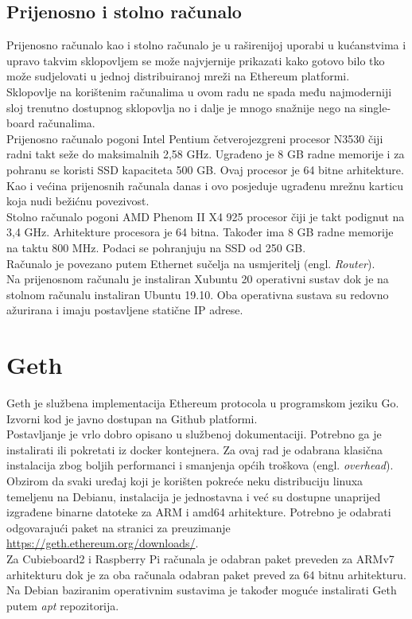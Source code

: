 \documentclass[times, utf8, zavrsni]{fer}
\begin{document}
\subsection{Prijenosno i stolno računalo}
Prijenosno računalo kao i stolno računalo je u raširenijoj uporabi u kućanstvima i upravo takvim sklopovljem se može
najvjernije prikazati kako gotovo bilo tko može sudjelovati u jednoj distribuiranoj mreži na Ethereum platformi. \\
Sklopovlje na korištenim računalima u ovom radu ne spada među najmoderniji sloj trenutno dostupnog sklopovlja no i dalje
je mnogo snažnije nego na single-board računalima. \\
Prijenosno računalo pogoni Intel Pentium četverojezgreni procesor N3530 čiji radni takt seže do maksimalnih 2,58 GHz.
Ugrađeno je 8 GB radne memorije i za pohranu se koristi SSD kapaciteta 500 GB. Ovaj procesor je 64 bitne arhitekture.
Kao i većina prijenosnih računala danas i ovo posjeduje ugrađenu mrežnu karticu koja nudi bežićnu povezivost. \\
Stolno računalo pogoni AMD Phenom II X4 925 procesor čiji je takt podignut na 3,4 GHz. Arhitekture procesora je 64 bitna.
Također ima 8 GB radne memorije na taktu 800 MHz. Podaci se pohranjuju na SSD od 250 GB. \\
Računalo je povezano putem Ethernet sučelja na usmjeritelj (engl. \emph{Router}). \\
Na prijenosnom računalu je instaliran Xubuntu 20 operativni sustav dok je na stolnom računalu instaliran Ubuntu 19.10.
Oba operativna sustava su redovno ažurirana i imaju postavljene statične IP adrese.
\section{Geth}
Geth je službena implementacija Ethereum protocola u programskom jeziku Go. Izvorni kod je javno dostupan na Github platformi. \\
Postavljanje je vrlo dobro opisano u službenoj dokumentaciji. Potrebno ga je instalirati ili pokretati iz docker kontejnera. 
Za ovaj rad je odabrana klasična instalacija zbog boljih performanci i smanjenja općih troškova (engl. \emph{overhead}).
Obzirom da svaki uređaj koji je korišten pokreće neku distribuciju linuxa temeljenu na Debianu, instalacija je jednostavna
i već su dostupne unaprijed izgrađene binarne datoteke za ARM i amd64 arhitekture. Potrebno je odabrati odgovarajući paket na
stranici za preuzimanje \url{https://geth.ethereum.org/downloads/}.\\ Za Cubieboard2 i Raspberry Pi računala je odabran paket
preveden za ARMv7 arhitekturu dok je za oba računala odabran paket preved za 64 bitnu arhitekturu. \\
Na Debian baziranim operativnim sustavima je također moguće instalirati Geth putem \emph{apt} repozitorija. \\
\end{document}
